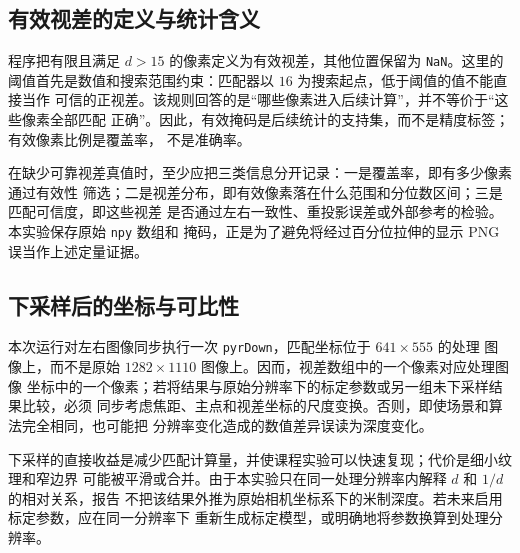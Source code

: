 \subsection{有效视差的定义与统计含义}

程序把有限且满足 $d>15$ 的像素定义为有效视差，其他位置保留为 \texttt{NaN}。这里的
阈值首先是数值和搜索范围约束：匹配器以 $16$ 为搜索起点，低于阈值的值不能直接当作
可信的正视差。该规则回答的是“哪些像素进入后续计算”，并不等价于“这些像素全部匹配
正确”。因此，有效掩码是后续统计的支持集，而不是精度标签；有效像素比例是覆盖率，
不是准确率。

在缺少可靠视差真值时，至少应把三类信息分开记录：一是覆盖率，即有多少像素通过有效性
筛选；二是视差分布，即有效像素落在什么范围和分位数区间；三是匹配可信度，即这些视差
是否通过左右一致性、重投影误差或外部参考的检验。本实验保存原始 \texttt{npy} 数组和
掩码，正是为了避免将经过百分位拉伸的显示 PNG 误当作上述定量证据。

\subsection{下采样后的坐标与可比性}

本次运行对左右图像同步执行一次 \texttt{pyrDown}，匹配坐标位于 $641\times555$ 的处理
图像上，而不是原始 $1282\times1110$ 图像上。因而，视差数组中的一个像素对应处理图像
坐标中的一个像素；若将结果与原始分辨率下的标定参数或另一组未下采样结果比较，必须
同步考虑焦距、主点和视差坐标的尺度变换。否则，即使场景和算法完全相同，也可能把
分辨率变化造成的数值差异误读为深度变化。

下采样的直接收益是减少匹配计算量，并使课程实验可以快速复现；代价是细小纹理和窄边界
可能被平滑或合并。由于本实验只在同一处理分辨率内解释 $d$ 和 $1/d$ 的相对关系，报告
不把该结果外推为原始相机坐标系下的米制深度。若未来启用标定参数，应在同一分辨率下
重新生成标定模型，或明确地将参数换算到处理分辨率。
